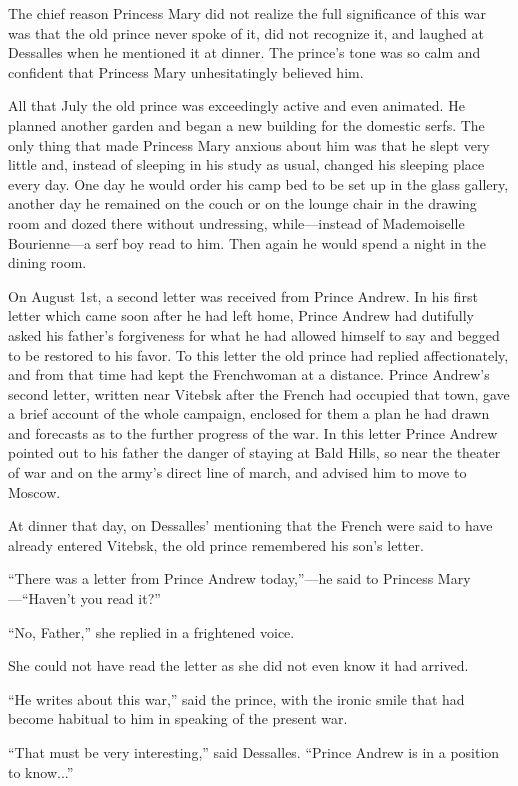 The chief reason Princess Mary did not realize the full
significance of this war was that the old prince never spoke of
it, did not recognize it, and laughed at Dessalles when he
mentioned it at dinner. The prince's tone was so calm and
confident that Princess Mary unhesitatingly believed him.

All that July the old prince was exceedingly active and even
animated.  He planned another garden and began a new building for
the domestic serfs. The only thing that made Princess Mary
anxious about him was that he slept very little and, instead of
sleeping in his study as usual, changed his sleeping place every
day. One day he would order his camp bed to be set up in the
glass gallery, another day he remained on the couch or on the
lounge chair in the drawing room and dozed there without
undressing, while---instead of Mademoiselle Bourienne---a serf
boy read to him. Then again he would spend a night in the dining
room.

On August 1st, a second letter was received from Prince
Andrew. In his first letter which came soon after he had left
home, Prince Andrew had dutifully asked his father's forgiveness
for what he had allowed himself to say and begged to be restored
to his favor. To this letter the old prince had replied
affectionately, and from that time had kept the Frenchwoman at a
distance. Prince Andrew's second letter, written near Vitebsk
after the French had occupied that town, gave a brief account of
the whole campaign, enclosed for them a plan he had drawn and
forecasts as to the further progress of the war. In this letter
Prince Andrew pointed out to his father the danger of staying at
Bald Hills, so near the theater of war and on the army's direct
line of march, and advised him to move to Moscow.

At dinner that day, on Dessalles' mentioning that the French were
said to have already entered Vitebsk, the old prince remembered
his son's letter.

``There was a letter from Prince Andrew today,''---he said to
Princess Mary---``Haven't you read it?''

``No, Father,'' she replied in a frightened voice.

She could not have read the letter as she did not even know it
had arrived.

``He writes about this war,'' said the prince, with the ironic
smile that had become habitual to him in speaking of the present
war.

``That must be very interesting,'' said Dessalles. ``Prince
Andrew is in a position to know...''

